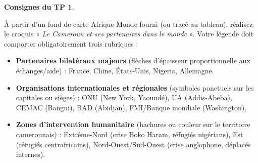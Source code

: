 \documentclass[11pt]{article}
\begin{document}
\textbf{Consignes du TP 1.}\par
À partir d'un fond de carte Afrique-Monde fourni (ou tracé au tableau), réalisez le croquis « \emph{Le Cameroun et ses partenaires dans le monde} ». Votre légende doit comporter obligatoirement trois rubriques :
\begin{itemize}
    \item \textbf{Partenaires bilatéraux majeurs} (flèches d'épaisseur proportionnelle aux échanges/aide) : France, Chine, États-Unis, Nigeria, Allemagne.
    \item \textbf{Organisations internationales et régionales} (symboles ponctuels sur les capitales ou sièges) : ONU (New York, Yaoundé), UA (Addis-Abeba), CEMAC (Bangui), BAD (Abidjan), FMI/Banque mondiale (Washington).
    \item \textbf{Zones d'intervention humanitaire} (hachures ou couleur sur le territoire camerounais) : Extrême-Nord (crise Boko Haram, réfugiés nigérians), Est (réfugiés centrafricains), Nord-Ouest/Sud-Ouest (crise anglophone, déplacés internes).
\end{itemize}
\end{document}

